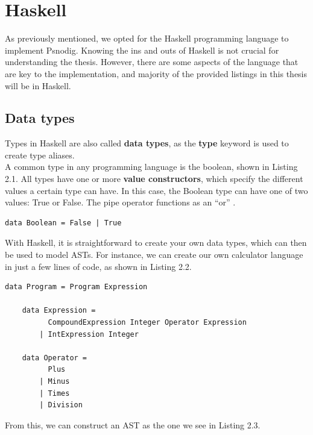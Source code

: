 \section{Haskell}

As previously mentioned, we opted for the Haskell programming language to implement Psnodig. Knowing the ins and outs of Haskell is not crucial for understanding the thesis. However, there are some aspects of the language that are key to the implementation, and majority of the provided listings in this thesis will be in Haskell.

\subsection{Data types}

Types in Haskell are also called \textbf{data types}, as the \textbf{type} keyword is used to create type aliases. \hfill \\

A common type in any programming language is the boolean, shown in Listing 2.1. All types have one or more \textbf{value constructors}, which specify the different values a certain type can have. In this case, the Boolean type can have one of two values: True or False. The pipe operator functions as an ``or'' \cite[be stian om å sjekke hvilken side dette eksemplet er på i boka]{LYAH}. \hfill \\

\begin{lstlisting}[caption={Recreating the Boolean data type with Haskell}, captionpos=b]
   data Boolean = False | True
\end{lstlisting}

With Haskell, it is straightforward to create your own data types, which can then be used to model ASTs. For instance, we can create our own calculator language in just a few lines of code, as shown in Listing 2.2. \hfill \\

\begin{lstlisting}[caption={Example data types in Haskell}, captionpos=b]
    data Program = Program Expression

    data Expression =
          CompoundExpression Integer Operator Expression
        | IntExpression Integer

    data Operator =
          Plus
        | Minus
        | Times
        | Division
\end{lstlisting}

From this, we can construct an AST as the one we see in Listing 2.3. \hfill \\

